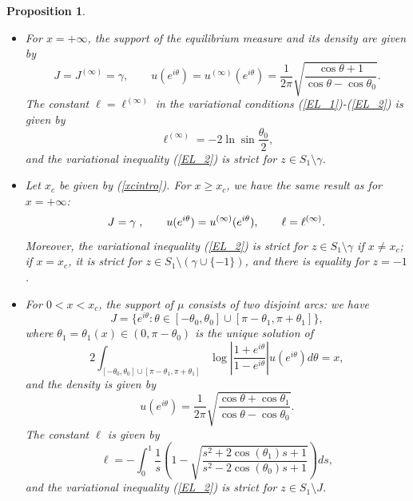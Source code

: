 \documentclass[11pt,fleqn]{article}
\numberwithin{equation}{section}
\newtheorem{proposition}[theorem]{Proposition}
\begin{document}
\begin{proposition}\label{thm200}
\begin{itemize}
\item[(a)] For $x = +\infty$, the support of the equilibrium measure and its density are given by
\begin{equation}\label{uinfty}
J=J^{(\infty)}=\gamma,\qquad u(e^{i\theta})=u^{(\infty)}(e^{i\theta}) = \frac{1}{2\pi} \sqrt{\frac{\cos \theta + 1}{\cos \theta - \cos \theta_{0}}}.
\end{equation}
The constant $\ell=\ell^{(\infty)}$ in the variational conditions (\ref{EL_1})-(\ref{EL_2}) is given by
\begin{equation}\label{linfy}
\ell^{(\infty)} = - 2 \ln \sin \frac{\theta_{0}}{2},
\end{equation}
and the variational inequality (\ref{EL_2}) is strict for $z\in S_1\setminus{\gamma}$.
\item[(b)]Let $x_c$ be given by (\ref{xcintro}). For $x \geq x_{c}$, we have the same result as for $x=+\infty$:
\begin{equation}\label{ux1}
J = \gamma \hspace{0.1cm},\qquad u(e^{i\theta}) = u^{(\infty)}(e^{i\theta}),\qquad \ell = \ell^{(\infty)}.
\end{equation}
Moreover, the variational inequality (\ref{EL_2}) is strict for $z\in S_1\setminus{\gamma}$ if $x\neq x_c$; if $x=x_c$, it is strict for $z\in S_1\setminus\left(\gamma \cup\{-1\}\right)$, and there is equality for $z=-1$.
\item[(c)] For $0 < x < x_{c}$, the support of $\mu$ consists of two disjoint arcs: we have
\begin{equation}\label{ux2}
J = \{ e^{i\theta} : \theta \in [-\theta_{0},\theta_{0}] \cup [\pi-\theta_{1},\pi + \theta_{1}] \} ,
\end{equation}
where $\theta_1=\theta_1(x)\in (0,\pi-\theta_0)$ is the unique solution of 
\begin{equation}\label{bijection_theta1_x}
2\int_{[-\theta_{0},\theta_{0}] \cup [\pi-\theta_{1},\pi + \theta_{1}]} \log \left| \frac{1+e^{i\theta}}{1-e^{i\theta}} \right| u(e^{i\theta}) d\theta = x,
\end{equation}
and the density is given by 
\begin{equation}
u(e^{i\theta}) = \frac{1}{2\pi} \sqrt{\frac{\cos \theta + \cos \theta_{1}}{\cos \theta - \cos \theta_{0}}}.
\end{equation}
The constant $\ell$ is given by
\begin{equation}\label{lx}
\ell = - \int_{0}^{1} \frac{1}{s} \left( 1 - \sqrt{\frac{s^2 + 2\cos (\theta_{1}) s +1}{s^2 - 2\cos (\theta_{0}) s +1}} \right) ds,
\end{equation}
and the variational inequality (\ref{EL_2}) is strict for $z\in S_1\setminus{J}$.
\end{itemize}
\end{proposition}
\end{document}
